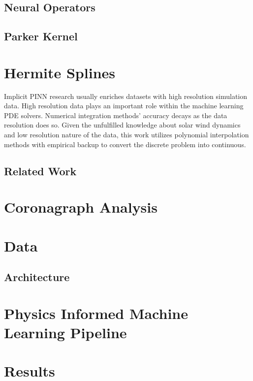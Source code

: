 \documentclass[12pt]{article}
\begin{document}
\subsection{Neural Operators}

\subsection{Parker Kernel}

\section{Hermite Splines}

Implicit PINN research usually enriches datasets with high resolution simulation data. High resolution data plays an important role within the machine learning PDE solvers. Numerical integration methods' accuracy decays as the data resolution does so.
Given the unfulfilled knowledge about solar wind dynamics and low resolution nature of the data, this work utilizes polynomial interpolation methods with empirical backup \cite{DBLP:journals/corr/abs-2109-07143} to convert the discrete problem into continuous.

\subsection{Related Work}

\section{Coronagraph Analysis}

\section{Data}

\subsection{Architecture}

\section{Physics Informed Machine Learning Pipeline}

\section{Results}
\end{document}

